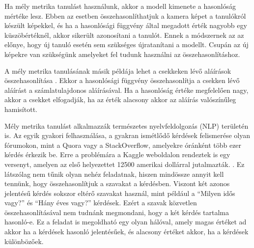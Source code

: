 Ha mély metrika tanulást használunk, akkor a modell kimenete a hasonlóság mértéke lesz. Ebben az esetben összehasonlíthatjuk a kamera képet a tanulókról készült képekkel, és ha a hasonlósági függvény által megadott érték nagyobb egy küszöbértéknél, akkor sikerült azonosítani a tanulót. Ennek a módszernek az az előnye, hogy új tanuló esetén sem szükséges újratanítani a modellt. Csupán az új képekre van szükségünk amelyeket fel tudunk használni az összehasonlításhoz.


A mély metrika tanulásának másik példája lehet a csekkeken lévő aláírások összehasonlítása \cite{soleimani2016signature}. Ekkor a hasonlósági függvény összehasonlítja a csekken lévő aláírást a számlatulajdonos aláírásával. Ha a hasonlóság értéke megfelelően nagy, akkor a csekket elfogadják, ha az érték alacsony akkor az aláírás valószínűleg hamisított.


Mély metrika tanulást alkalmazzák természetes nyelvfeldolgozás (NLP) területén is. Az egyik gyakori felhasználása, a gyakran ismétlődő kérdések felismerése olyan fórumokon, mint a Quora vagy a StackOverflow, amelyekre óránként több ezer kérdés érkezik be. Erre a problémára a Kaggle weboldalon rendeztek is egy versenyt, amelyen az első helyezettet 12500 amerikai dollárral jutalmazták. \cite{kaggle}. Ez látszólag nem tűnik olyan nehéz feladatnak, hiszen mindössze annyit kell tennünk, hogy összehasonlítjuk a szavakat a kérdésben. Viszont két azonos jelentésű kérdés sokszor eltérő szavakat használ, mint például a ``Milyen idős vagy?'' és ``Hány éves vagy?'' kérdések. Ezért a szavak közvetlen összehasonlításával nem tudnánk megmondani, hogy a két kérdés tartalma hasonló-e. Ez a feladat is megoldható egy olyan hálóval, amely magas értéket ad akkor ha a kérdések hasonló jelentésűek, és alacsony értéket akkor, ha a kérdések különbözőek.

